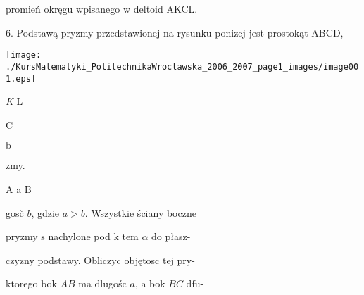\documentclass[a4paper,12pt]{article}
\begin{document}
promień okręgu wpisanego $\mathrm{w}$ deltoid AKCL.

6. Podstawą pryzmy przedstawionej na rysunku ponizej jest prostokąt ABCD,
\begin{center}
\texttt{[image: ./KursMatematyki\_PolitechnikaWroclawska\_2006\_2007\_page1\_images/image001.eps]}
\end{center}
{\it K} $\mathrm{L}$

C

$\mathrm{b}$

zmy.

A a $\mathrm{B}$

gosč $b$, gdzie $a>b$. Wszystkie ściany boczne

pryzmy $\mathrm{s}$ nachylone pod $\mathrm{k}$ tem $\alpha$ do płasz-

czyzny podstawy. Obliczyc objętosc tej pry-

ktorego bok $AB$ ma dlugośc $a$, a bok $BC$ dfu-
\end{document}
